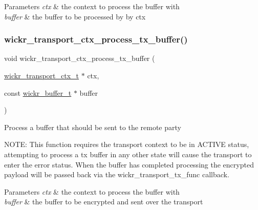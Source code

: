 \begin{DoxyParams}{Parameters}
{\em ctx} & the context to process the buffer with \\
\hline
{\em buffer} & the buffer to be processed by by \textquotesingle{}ctx\textquotesingle{} \\
\hline
\end{DoxyParams}
\mbox{\label{group__wickr__transport__ctx_gad9d2f86832cfb9c1948ba679fabbedbc}} 
\subsubsection{\texorpdfstring{wickr\+\_\+transport\+\_\+ctx\+\_\+process\+\_\+tx\+\_\+buffer()}{wickr\_transport\_ctx\_process\_tx\_buffer()}}
{\footnotesize\ttfamily void wickr\+\_\+transport\+\_\+ctx\+\_\+process\+\_\+tx\+\_\+buffer (\begin{DoxyParamCaption}\item[{\hyperlink{structwickr__transport__ctx}{wickr\+\_\+transport\+\_\+ctx\+\_\+t} $\ast$}]{ctx,  }\item[{const \hyperlink{structwickr__buffer}{wickr\+\_\+buffer\+\_\+t} $\ast$}]{buffer }\end{DoxyParamCaption})}

Process a buffer that should be sent to the remote party

N\+O\+TE\+: This function requires the transport context to be in A\+C\+T\+I\+VE status, attempting to process a tx buffer in any other state will cause the transport to enter the error status. When the buffer has completed processing the encrypted payload will be passed back via the wickr\+\_\+transport\+\_\+tx\+\_\+func callback.


\begin{DoxyParams}{Parameters}
{\em ctx} & the context to process the buffer with \\
\hline
{\em buffer} & the buffer to be encrypted and sent over the transport \\
\hline
\end{DoxyParams}
\mbox{\label{group__wickr__transport__ctx_gaee74761e31d5f0a6fc97e2ccf5ac1e29}} 
